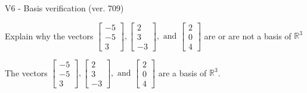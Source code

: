 \begin{exercise}
  \begin{exerciseTitle}V6 - Basis verification (ver. 709)\end{exerciseTitle}
  \begin{exerciseStatement}
    Explain why the vectors \(\left[\begin{array}{r}
-5 \\
-5 \\
3
\end{array}\right] , \left[\begin{array}{r}
2 \\
3 \\
-3
\end{array}\right] , \text{ and } \left[\begin{array}{r}
2 \\
0 \\
4
\end{array}\right]\) are or are not a basis of \(\mathbb{R}^3\)	


  \end{exerciseStatement}
  \begin{exerciseAnswer}
   The vectors \(\left[\begin{array}{r}
-5 \\
-5 \\
3
\end{array}\right] , \left[\begin{array}{r}
2 \\
3 \\
-3
\end{array}\right] , \text{ and } \left[\begin{array}{r}
2 \\
0 \\
4
\end{array}\right]\) 
  	 are  a basis of \(\mathbb{R}^3\).
  


  \end{exerciseAnswer}
\end{exercise}